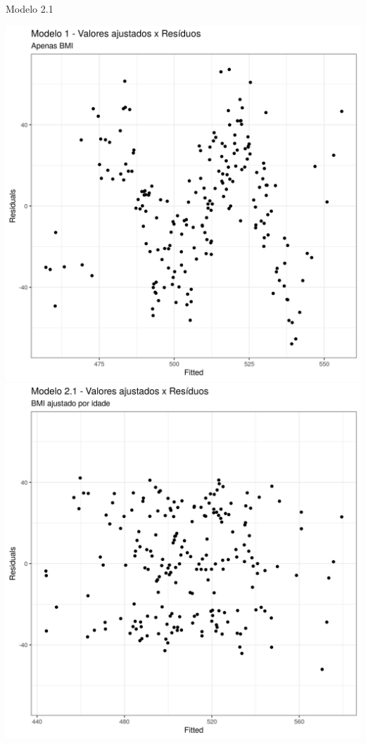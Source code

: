 \documentclass{beamer}
\begin{document}
\begin{frame}{\scriptsize Modelo 2.1}
  \begin{center}
    \includegraphics[height=.6\textheight]{Cap31-32/pratica-rlm1-resid}
    \includegraphics[height=.6\textheight]{Cap31-32/pratica-rlm2_1-resid}
  \end{center}
\end{frame}
\end{document}
